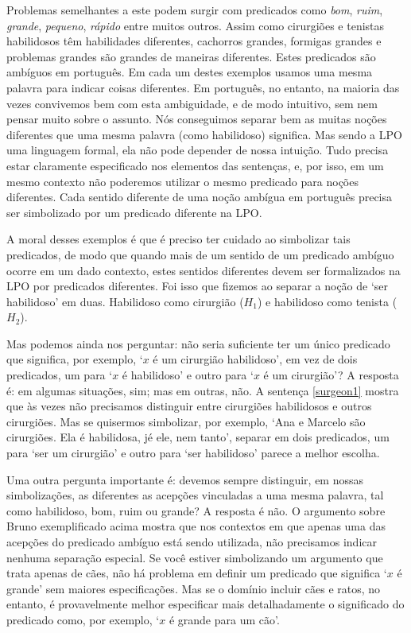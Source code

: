Problemas semelhantes a este podem surgir com predicados como \emph{bom}, \emph{ruim}, \emph{grande}, \emph{pequeno}, \emph{rápido} entre muitos outros.
Assim como cirurgiões e tenistas habilidosos têm habilidades diferentes, cachorros grandes, formigas grandes e problemas grandes são grandes de maneiras diferentes.
Estes predicados são ambíguos em português.
Em cada um destes exemplos usamos uma mesma palavra para indicar coisas diferentes.
Em português, no entanto, na maioria das vezes convivemos bem com esta ambiguidade, e de modo intuitivo, sem nem pensar muito sobre o assunto.
Nós conseguimos separar bem as muitas noções diferentes que uma mesma palavra (como habilidoso) significa.
Mas sendo a LPO uma linguagem formal, ela não pode depender de nossa intuição.
Tudo precisa estar claramente especificado nos elementos das sentenças, e, por isso, em um mesmo contexto não poderemos utilizar o mesmo predicado para noções diferentes.
Cada sentido diferente de uma noção ambígua em português precisa ser simbolizado por um predicado diferente na LPO.

A moral desses exemplos é que é preciso ter cuidado ao simbolizar tais predicados, de modo que quando mais de um sentido de um predicado ambíguo ocorre em um dado contexto, estes sentidos diferentes devem ser formalizados na LPO por predicados diferentes.
Foi isso que fizemos ao separar a noção de `ser habilidoso' em duas. Habilidoso como cirurgião ($H_1$) e habilidoso como tenista ($H_2$). 

Mas podemos ainda nos perguntar: não seria suficiente ter um único predicado que significa, por exemplo, `$x$ é um cirurgião habilidoso', em vez de dois predicados, um para  `$x$ é habilidoso' e outro para  `$x$ é um cirurgião'?
A resposta é: em algumas situações, sim; mas em outras, não.
A sentença \ref{surgeon1} mostra que às vezes não precisamos distinguir entre cirurgiões habilidosos e outros cirurgiões.
Mas se quisermos simbolizar, por exemplo, `Ana e Marcelo são cirurgiões. Ela é habilidosa, jé ele, nem tanto', separar em dois predicados, um para `ser um cirurgião' e outro para `ser habilidoso' parece a melhor escolha.

Uma outra pergunta importante é: devemos sempre distinguir, em nossas simbolizações, as diferentes as acepções vinculadas a uma mesma palavra, tal como habilidoso, bom, ruim ou grande?
A resposta é não. O argumento sobre Bruno exemplificado acima mostra que nos contextos em que apenas uma das acepções do predicado ambíguo está sendo utilizada, não precisamos indicar nenhuma separação especial.
Se você estiver simbolizando um argumento que trata apenas de cães, não há problema em definir um predicado que significa `$x$ é grande' sem maiores especificações.
Mas se o domínio incluir cães e ratos, no entanto, é provavelmente melhor especificar mais detalhadamente o significado do predicado como, por exemplo, `$x$ é grande para um cão'.


